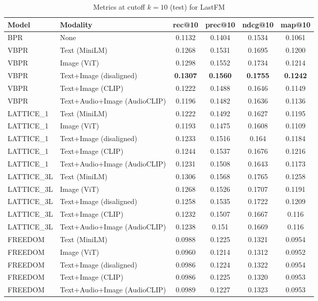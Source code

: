 \begin{table}[H]
    \centering
    \begin{adjustbox}{max width=\textwidth}
    \begin{tabular}{|l|l|c|c|c|c|}
    \hline
    	\textbf{Model} & \textbf{Modality} & \textbf{rec@10} & \textbf{prec@10} & \textbf{ndcg@10} & \textbf{map@10} \\
    \hline
    BPR & None & 0.1132 & 0.1404 & 0.1534 & 0.1061 \\
    \hline
    VBPR & Text (MiniLM) & 0.1268 & 0.1531 & 0.1695 & 0.1200 \\
    \hline
    VBPR & Image (ViT) & 0.1298 & 0.1552 & 0.1734 & 0.1214 \\
    \hline
    VBPR & Text+Image (disaligned) & \textbf{0.1307} & \textbf{0.1560} & \textbf{0.1755} & \textbf{0.1242} \\
    \hline
    VBPR & Text+Image (CLIP) & 0.1222 & 0.1488 & 0.1646 & 0.1149 \\
    \hline
    VBPR & Text+Audio+Image (AudioCLIP) & 0.1196 & 0.1482 & 0.1636 & 0.1136 \\
    \hline
    LATTICE\_1 & Text (MiniLM) & 0.1222 & 0.1492 & 0.1627 & 0.1195 \\
    \hline
    LATTICE\_1 & Image (ViT) & 0.1193 & 0.1475 & 0.1608 & 0.1109 \\
    \hline
    LATTICE\_1 & Text+Image (disaligned) & 0.1233 & 0.1516 & 0.164 & 0.1184 \\
    \hline
    LATTICE\_1 & Text+Image (CLIP) & 0.1244 & 0.1537 & 0.1676 & 0.1216 \\
    \hline
    LATTICE\_1 & Text+Audio+Image (AudioCLIP) & 0.1231 & 0.1508 & 0.1643 & 0.1173 \\
    \hline
    LATTICE\_3L & Text (MiniLM) & 0.1306 & 0.1568 & 0.1765 & 0.1258 \\
    \hline
    LATTICE\_3L & Image (ViT) & 0.1268 & 0.1526 & 0.1707 & 0.1191 \\
    \hline
    LATTICE\_3L & Text+Image (disaligned) & 0.1258 & 0.1535 & 0.1722 & 0.1209 \\
    \hline
    LATTICE\_3L & Text+Image (CLIP) & 0.1232 & 0.1507 & 0.1667 & 0.116 \\
    \hline
    LATTICE\_3L & Text+Audio+Image (AudioCLIP) & 0.1238 & 0.151 & 0.1669 & 0.116 \\
    \hline
    FREEDOM & Text (MiniLM) & 0.0988 & 0.1225 & 0.1321 & 0.0954 \\
    \hline
    FREEDOM & Image (ViT) & 0.0960 & 0.1214 & 0.1312 & 0.0952 \\
    \hline
    FREEDOM & Text+Image (disaligned) & 0.0986 & 0.1224 & 0.1322 & 0.0954 \\
    \hline
    FREEDOM & Text+Image (CLIP) & 0.0986 & 0.1225 & 0.1320 & 0.0953 \\
    \hline
    FREEDOM & Text+Audio+Image (AudioCLIP) & 0.0989 & 0.1227 & 0.1323 & 0.0953 \\
    \hline
    \end{tabular}
    \end{adjustbox}
    \caption{Metrics at cutoff $k=10$ (test) for LastFM}
    \label{tab:metrics_lastfm_k10}
\end{table}

